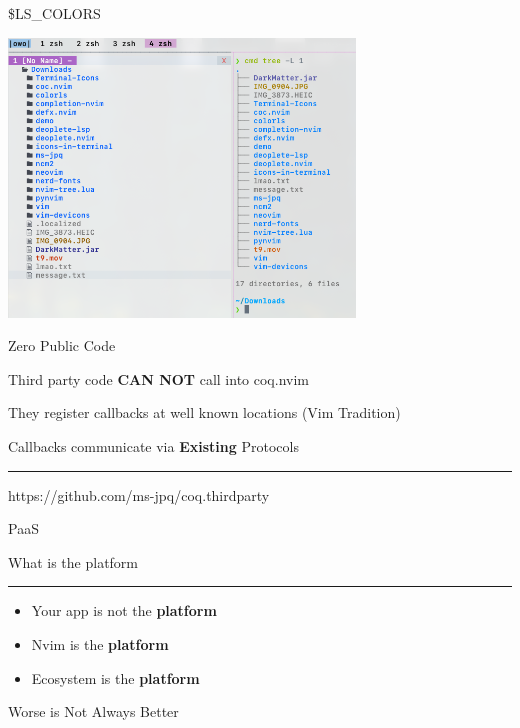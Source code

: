 \documentclass{beamer}
\begin{document}
\begin{frame}{\$LS\_COLORS}

	\includegraphics[width=\textwidth,height=20em]{chadtree_ls}

\end{frame}


\begin{frame}{Zero Public Code}

	Third party code \textbf{CAN NOT} call into coq.nvim

	They register callbacks at well known locations (Vim Tradition)

	Callbacks communicate via \textbf{Existing} Protocols

	\rule{\textwidth}{0.1em}

	https://github.com/ms-jpq/coq.thirdparty

\end{frame}


\begin{frame}{PaaS}

	What is the platform

	\rule{\textwidth}{0.1em}

	\begin{itemize}

		\item Your app is not the \textbf{platform}

		\item Nvim is the \textbf{platform}

		\item Ecosystem is the \textbf{platform}

	\end{itemize}

\end{frame}


\begin{frame}[standout]

	Worse is Not Always Better

\end{frame}
\end{document}
